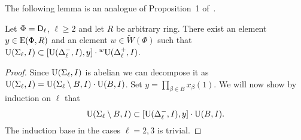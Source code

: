 The following lemma is an analogue of Proposition~1 of~\cite{NikProdDecomp}.
\begin{lemma}\label{lemma:nikolov-type-dl}
Let $\Phi=\mathsf{D}_\ell$, $\ell\geq 2$ and let $R$ be arbitrary ring.
There exist an element $y\in\operatorname{E}(\Phi,R)$ and an element $w\in\widetilde{W}(\Phi)$ such that $\operatorname{U}(\Sigma_\ell, I)\subset[\operatorname{U}(\Delta_\ell^-, I),y]\cdot{}^w\!\operatorname{U}(\Delta_\ell^+, I)$.
\end{lemma}
\begin{proof}
Since $\operatorname{U}(\Sigma_\ell, I)$ is abelian we can decompose it as $\operatorname{U}(\Sigma_\ell, I)=\operatorname{U}(\Sigma_\ell\setminus B, I) \cdot \operatorname{U}(B, I)$. 
Set $y=\prod_{\beta\in B}x_\beta(1)$. 
We will now show by induction on $\ell$ that 
\begin{equation}\label{eq:ind-stat} \operatorname{U}(\Sigma_\ell\setminus B, I)\subset[\operatorname{U}(\Delta_\ell^-, I),y]\cdot\operatorname{U}(B, I). \end{equation}
The induction base in the cases $\ell=2,3$ is trivial.


\end{proof}
